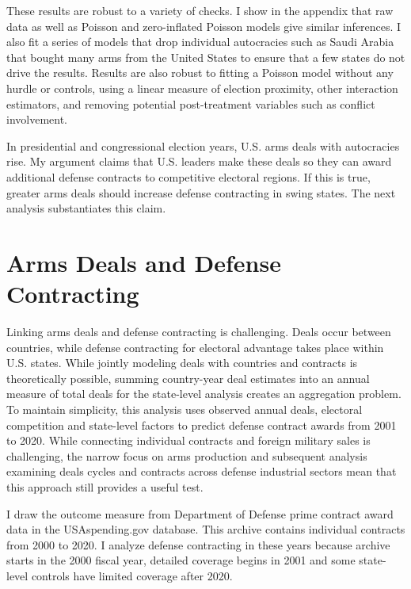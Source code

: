 \documentclass[12pt]{article}
\begin{document}
These results are robust to a variety of checks. 
I show in the appendix that raw data as well as Poisson and zero-inflated Poisson models give similar inferences. 
I also fit a series of models that drop individual autocracies such as Saudi Arabia that bought many arms from the United States to ensure that a few states do not drive the results. 
Results are also robust to fitting a Poisson model without any hurdle or controls, using a linear measure of election proximity, other interaction estimators, and removing potential post-treatment variables such as conflict involvement. 


In presidential and congressional election years, U.S. arms deals with autocracies rise.
My argument claims that U.S. leaders make these deals so they can award additional defense contracts to competitive electoral regions. 
If this is true, greater arms deals should increase defense contracting in swing states. 
The next analysis substantiates this claim.


\section{Arms Deals and Defense Contracting}


Linking arms deals and defense contracting is challenging. 
Deals occur between countries, while defense contracting for electoral advantage takes place within U.S. states.
While jointly modeling deals with countries and contracts is theoretically possible, summing country-year deal estimates into an annual measure of total deals for the state-level analysis creates an aggregation problem. %
To maintain simplicity, this analysis uses observed annual deals, electoral competition and state-level factors to predict defense contract awards from 2001 to 2020. 
While connecting individual contracts and foreign military sales is challenging, the narrow focus on arms production and subsequent analysis examining deals cycles and contracts across defense industrial sectors mean that this approach still provides a useful test. 


I draw the outcome measure from Department of Defense prime contract award data in the USAspending.gov database.%
This archive contains individual contracts from 2000 to 2020.
I analyze defense contracting in these years because archive starts in the 2000 fiscal year, detailed coverage begins in 2001 and some state-level controls have limited coverage after 2020.
\end{document}
